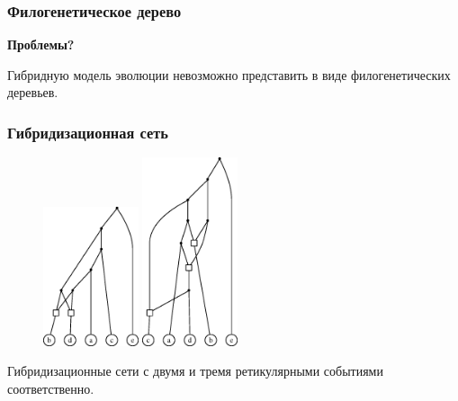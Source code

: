 \documentclass[hyperref={unicode}]{beamer}
\begin{document}
\begin{frame}
\frametitle{Филогенетическое дерево}

\textbf{Проблемы?}

Гибридную модель эволюции невозможно представить в виде филогенетических деревьев.

\end{frame}




\begin{frame}
\frametitle{Гибридизационная сеть}

\centering

\begin{figure}[t]
	\includegraphics[width=2.8cm]{img/ans.eps}
	\hspace{1cm}
	\includegraphics[width=2.8cm]{img/ans3.eps}
\end{figure}

Гибридизационные сети с двумя и тремя ретикулярными событиями соответственно.

\end{frame} 
\end{document}
